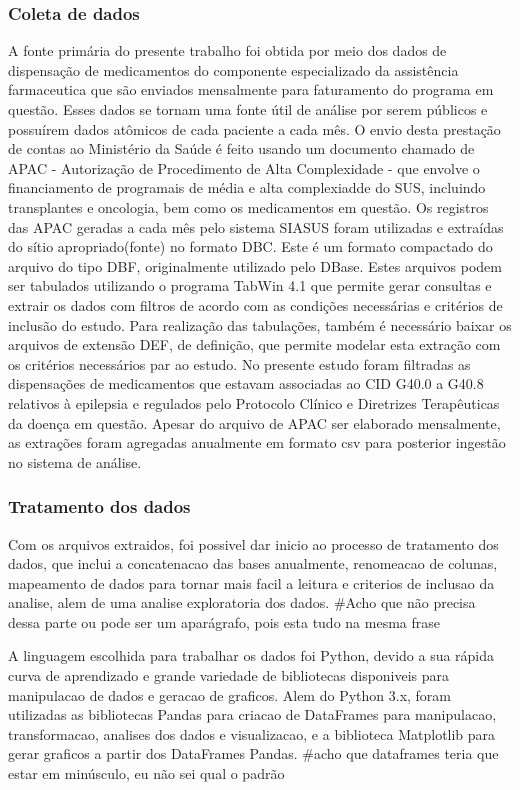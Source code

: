 \documentclass[article,a4paper,12pt,brazil,sumario=tradicional]{abntex2}
\begin{document}
\subsubsection{Coleta de dados}
A fonte primária do presente trabalho foi obtida por meio dos dados de dispensação de medicamentos do componente especializado da assistência farmaceutica que são enviados mensalmente para faturamento do programa em questão. Esses dados se tornam uma fonte útil de análise por serem públicos e possuírem dados atômicos de cada paciente a cada mês. O envio desta prestação de contas ao Ministério da Saúde é feito usando um documento chamado de APAC - Autorização de Procedimento de Alta Complexidade - que envolve o financiamento de programais de média e alta complexiadde do SUS, incluindo transplantes e oncologia, bem como os medicamentos em questão. 
Os registros das APAC geradas a cada mês pelo sistema SIASUS foram utilizadas e extraídas do sítio apropriado(fonte) no formato DBC. Este é um formato compactado do arquivo do tipo DBF, originalmente utilizado pelo DBase. Estes arquivos podem ser tabulados utilizando o programa TabWin 4.1 que permite gerar consultas e extrair os dados com filtros de acordo com as condições necessárias e critérios de inclusão do estudo. Para realização das tabulações, também é necessário baixar os arquivos de extensão DEF, de definição, que permite modelar esta extração com os critérios necessários par ao estudo. 
No presente estudo foram filtradas as dispensações de medicamentos que estavam associadas ao CID G40.0 a G40.8 relativos à epilepsia e regulados pelo Protocolo Clínico e Diretrizes Terapêuticas da doença em questão. Apesar do arquivo de APAC ser elaborado mensalmente, as extrações foram agregadas anualmente em formato csv para posterior ingestão no sistema de análise.

\subsubsection{Tratamento dos dados}

Com os arquivos extraidos, foi possivel dar inicio ao processo de tratamento dos dados, que inclui a concatenacao das bases anualmente, renomeacao de colunas, mapeamento de dados para tornar mais facil a leitura e criterios de inclusao da analise, alem de uma analise exploratoria dos dados. #Acho que não precisa dessa parte ou pode ser um aparágrafo, pois esta tudo na mesma frase

A linguagem escolhida para trabalhar os dados foi Python, devido a sua rápida curva de aprendizado e grande variedade de bibliotecas disponiveis para manipulacao de dados e geracao de graficos. Alem do Python 3.x, foram utilizadas as bibliotecas Pandas para criacao de DataFrames para manipulacao, transformacao, analises dos dados e visualizacao, e a biblioteca Matplotlib para gerar graficos a partir dos DataFrames Pandas. #acho que dataframes teria que estar em minúsculo, eu não sei qual o padrão
\end{document}
